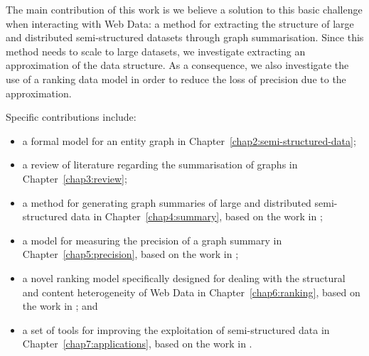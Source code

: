 The main contribution of this work is we believe a solution to this basic challenge when interacting with Web Data: a method for extracting the structure of large and distributed semi-structured datasets through graph summarisation. Since this method needs to scale to large datasets, we investigate extracting an approximation of the data structure. As a consequence, we also investigate the use of a ranking data model in order to reduce the loss of precision due to the approximation.

Specific contributions include:
\begin{itemize}
	\item a formal model for an entity graph in Chapter~\ref{chap2:semi-structured-data};
	\item a review of literature regarding the summarisation of graphs in Chapter~\ref{chap3:review};
	\item a method for generating graph summaries of large and distributed semi-structured data in Chapter~\ref{chap4:summary}, based on the work in \cite{campinas:2012:dexa,campinas:2013:efficiency};
	\item a model for measuring the precision of a graph summary in Chapter~\ref{chap5:precision}, based on the work in \cite{campinas:2013:efficiency};
	\item a novel ranking model specifically designed for dealing with the structural and content heterogeneity of Web Data in Chapter~\ref{chap6:ranking}, based on the work in \cite{campinas:2011:semsearch,campinas:2012:bm25mf}; and
	\item a set of tools for improving the exploitation of semi-structured data in Chapter~\ref{chap7:applications}, based on the work in \cite{auer:2014:linked}.
\end{itemize}
